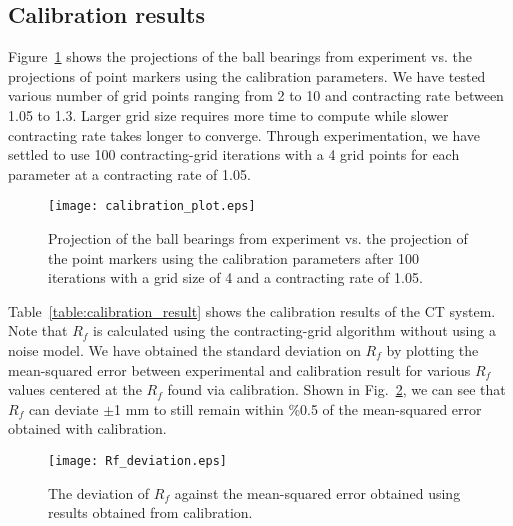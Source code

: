 \subsection{Calibration results}
\label{subsect:cali_results}
Figure~\ref{fig:calibration_plot} shows the projections of the ball bearings from experiment vs. the projections of point markers using the calibration parameters.  We have tested various number of grid points ranging from 2 to 10 and contracting rate between 1.05 to 1.3.  Larger grid size requires more time to compute while slower contracting rate takes longer to converge.  Through experimentation, we have settled to use 100 contracting-grid iterations with a 4 grid points for each parameter at a contracting rate of 1.05.
%
\begin{figure}[h]
\texttt{[image: calibration\_plot.eps]}
\caption{Projection of the ball bearings from experiment vs. the projection of the point markers using the calibration parameters after 100 iterations with a grid size of 4 and a contracting rate of 1.05.}
\label{fig:calibration_plot}
\end{figure}

Table~\ref{table:calibration_result} shows the calibration results of the CT system.  Note that $R_f$ is calculated using the contracting-grid algorithm without using a noise model.  We have obtained the standard deviation on $R_f$ by plotting the mean-squared error between experimental and calibration result for various $R_f$ values centered at the $R_f$ found via calibration.  Shown in Fig.~\ref{fig:Rf_deviation}, we can see that $R_f$ can deviate $\pm$1 mm to still remain within \%0.5 of the mean-squared error obtained with calibration.
%
\begin{figure}
	\texttt{[image: Rf\_deviation.eps]}
	\caption{The deviation of $R_f$ against the mean-squared error obtained using results obtained from calibration.}
	\label{fig:Rf_deviation}
\end{figure}
%

